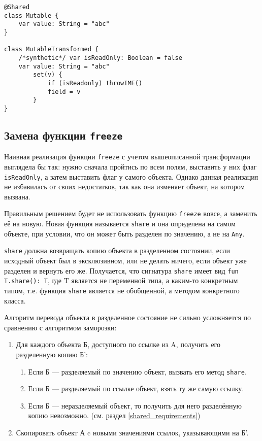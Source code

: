 \documentclass[specification,annotation,times]{itmo-student-thesis}
\begin{document}
\begin{lstlisting}[float=h!,caption={Код до и после трансформации}]
@Shared
class Mutable {
	var value: String = "abc"
}

class MutableTransformed {
	/*synthetic*/ var isReadOnly: Boolean = false
	var value: String = "abc"
		set(v) {
			if (isReadonly) throwIME() 
			field = v
		}
}
\end{lstlisting}

\subsection{Замена функции \texttt{freeze}}\label{def_share}

Наивная реализация функции \texttt{freeze} с учетом вышеописанной трансформации выглядела бы так: нужно сначала пройтись по всем полям, выставить у них флаг \texttt{isReadOnly}, а затем выставить флаг у самого объекта.
Однако данная реализация не избавилась от своих недостатков, так как она изменяет объект, на котором вызвана.

Правильным решением будет не использовать функцию \texttt{freeze} вовсе, а заменить её на новую. Новая функция называется \texttt{share} и она определена на самом объекте, при условии, что он может быть разделен по значению, а не на \texttt{Any}.

\texttt{share} должна возвращать копию объекта в разделенном состоянии, если исходный объект был в эксклюзивном, или не делать ничего, если объект уже разделен и вернуть его же.
Получается, что сигнатура \texttt{share} имеет вид \texttt{fun T.share(): T}, где T является не переменной типа, а каким-то конкретным типом, т.е. функция \texttt{share} является не обобщенной, а методом конкретного класса.

Алгоритм перевода объекта в разделенное состояние не сильно усложняется по сравнению с алгоритмом заморозки:

\begin{enumerate}
	\item Для каждого объекта Б, доступного по ссылке из A, получить его разделенную копию Б':
	\begin{enumerate}
		\item Если Б --- разделяемый по значению объект, вызвать его метод \texttt{share}.
		\item Если Б --- разделяемый по ссылке объект, взять ту же самую ссылку.
		\item Если Б --- неразделяемый объект, то получить для него разделённую копию невозможно. (см. раздел \ref{shared_requirements})
	\end{enumerate}
	\item Скопировать объект А c новыми значениями ссылок, указывающими на Б'.
\end{enumerate}
\end{document}
